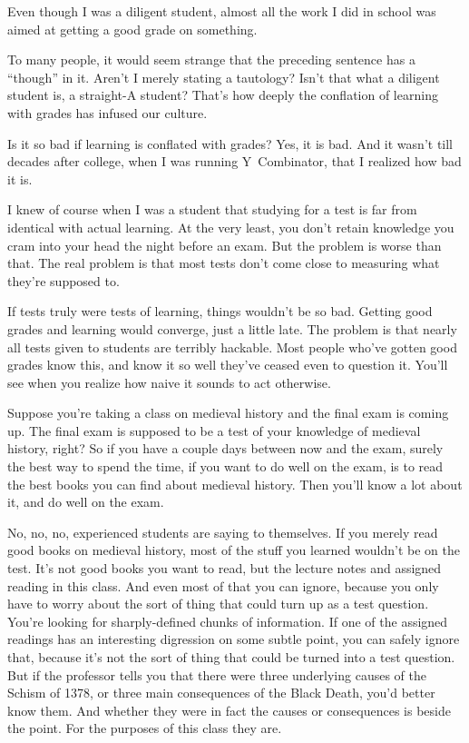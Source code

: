 \documentclass[12pt]{book}
\begin{document}
Even though I was a diligent student, almost all the work I did in
school was aimed at getting a good grade on something.

To many people, it would seem strange that the preceding sentence has a
``though'' in it. Aren't I merely stating a tautology? Isn't that what a
diligent student is, a straight-A student? That's how deeply the
conflation of learning with grades has infused our culture.

Is it so bad if learning is conflated with grades? Yes, it is bad. And
it wasn't till decades after college, when I was running Y~Combinator,
that I realized how bad it is.

I knew of course when I was a student that studying for a test is far
from identical with actual learning. At the very least, you don't retain
knowledge you cram into your head the night before an exam. But the
problem is worse than that. The real problem is that most tests don't
come close to measuring what they're supposed to.

If tests truly were tests of learning, things wouldn't be so bad.
Getting good grades and learning would converge, just a little late. The
problem is that nearly all tests given to students are terribly
hackable. Most people who've gotten good grades know this, and know it
so well they've ceased even to question it. You'll see when you realize
how naive it sounds to act otherwise.

Suppose you're taking a class on medieval history and the final exam is
coming up. The final exam is supposed to be a test of your knowledge of
medieval history, right? So if you have a couple days between now and
the exam, surely the best way to spend the time, if you want to do well
on the exam, is to read the best books you can find about medieval
history. Then you'll know a lot about it, and do well on the exam.

No, no, no, experienced students are saying to themselves. If you merely
read good books on medieval history, most of the stuff you learned
wouldn't be on the test. It's not good books you want to read, but the
lecture notes and assigned reading in this class. And even most of that
you can ignore, because you only have to worry about the sort of thing
that could turn up as a test question. You're looking for
sharply-defined chunks of information. If one of the assigned readings
has an interesting digression on some subtle point, you can safely
ignore that, because it's not the sort of thing that could be turned
into a test question. But if the professor tells you that there were
three underlying causes of the Schism of 1378, or three main
consequences of the Black Death, you'd better know them. And whether
they were in fact the causes or consequences is beside the point. For
the purposes of this class they are.
\end{document}

